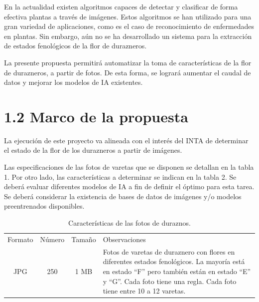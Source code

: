 \documentclass[
11pt, %
]{charter}
\begin{document}
En la actualidad existen algoritmos capaces de detectar y clasificar de forma efectiva plantas a través de imágenes. Estos algoritmos se han utilizado para una gran variedad de aplicaciones, como es el caso de reconocimiento de enfermedades en plantas. Sin embargo, aún no se ha desarrollado un sistema para la extracción de estados fenológicos de la flor de durazneros.

La presente propuesta permitirá automatizar la toma de características de la flor de durazneros, a partir de fotos. De esta forma, se logrará aumentar el caudal de datos y mejorar los modelos de IA existentes.

\section{1.2 Marco de la propuesta}
\label{sec:descripcion}

La ejecución de este proyecto va alineada con el interés del INTA de determinar el estado de la flor de los durazneros a partir de imágenes.

Las especificaciones de las fotos de varetas que se disponen se detallan en la tabla 1. Por otro lado, las características a determinar se indican en la tabla 2. Se deberá evaluar diferentes modelos de IA a fin de definir el óptimo para esta tarea. Se deberá considerar la existencia de bases de datos de imágenes y/o modelos preentrenados disponibles.

\renewcommand{\tablename}{Tabla}
\begin{table}[ht]
\begin{center}
\begin{tabularx}{\textwidth}{| c | c | c | X | }
\hline
\rowcolor[HTML]{C0C0C0}
\multicolumn{4}{ |c| }{Características de las fotos de duraznos} \\ \hline
Formato & Número & Tamaño & Observaciones \\ \hline
JPG     & 250    & 1 MB   & Fotos de varetas de duraznero con flores en           diferentes estados fenológicos. La mayoría está en estado “F” pero también están en estado “E” y “G”. Cada foto tiene una regla. Cada foto tiene entre 10 a 12 varetas. \\ \hline
\end{tabularx}
\caption{Características de las fotos de duraznos.}
\label{tab:coches}
\end{center}
\end{table}
\end{document}
